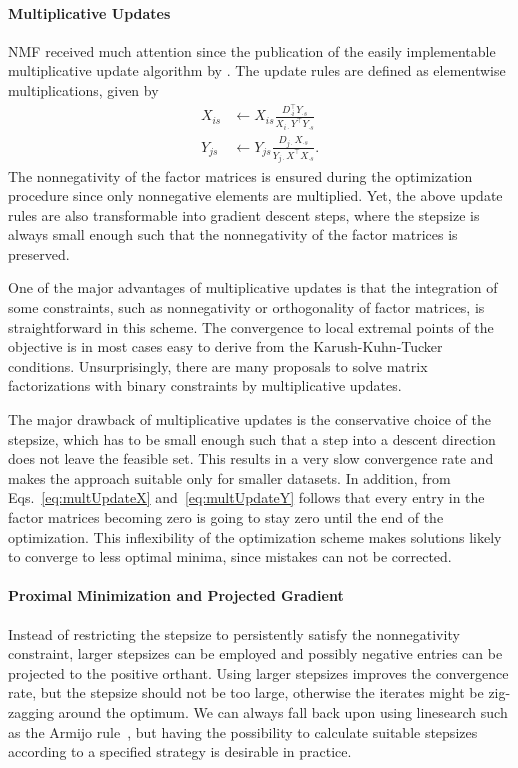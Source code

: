 \paragraph{Multiplicative Updates}
NMF received much attention since the publication of the easily implementable multiplicative update algorithm by \cite{lee2001algorithms}. The update rules are defined as elementwise multiplications, given by
\begin{align}
X_{is} &\leftarrow X_{is} \frac{D_{\cdot i}^\top Y_{\cdot s}}{X_{i\cdot}Y^\top Y_{\cdot s}}\label{eq:multUpdateX}\\
Y_{js} &\leftarrow Y_{js}\frac{D_{j\cdot}X_{\cdot s}}{Y_{j\cdot}X^\top X_{\cdot s}}. \label{eq:multUpdateY} 
\end{align}
The nonnegativity of the factor matrices is ensured during the optimization procedure since only nonnegative elements are multiplied. Yet, the above update rules are also transformable into gradient descent steps, where the stepsize is always small enough such that the nonnegativity of the factor matrices is preserved.

One of the major advantages of multiplicative updates is that the integration of some constraints, such as nonnegativity or orthogonality of factor matrices, is straightforward in this scheme. The  convergence to local extremal points of the objective is in most cases easy to derive from the Karush-Kuhn-Tucker conditions. Unsurprisingly, there are many proposals to solve matrix factorizations with binary constraints by multiplicative updates.  

The major drawback of multiplicative updates is the conservative choice of the stepsize, which has to be small enough such that a step into a descent direction does not leave the feasible set. This results in a very slow convergence rate and makes the approach suitable only for smaller datasets. In addition, from Eqs.~\eqref{eq:multUpdateX} and~\eqref{eq:multUpdateY} follows that every entry in the factor matrices becoming zero is going to stay zero until the end of the optimization. This inflexibility of the optimization scheme makes solutions likely to converge to less optimal minima, since mistakes can not be corrected. 
%
\paragraph{Proximal Minimization and Projected Gradient}
Instead of restricting the stepsize to persistently satisfy the nonnegativity constraint, larger stepsizes can be employed and possibly negative entries can be projected to the positive orthant. Using larger stepsizes improves the convergence rate, but the stepsize should not be too large, otherwise the iterates might be zig-zagging around the optimum. We can always fall back upon using linesearch such as the Armijo rule~\citep{lin2007projected}, but having the possibility to calculate suitable stepsizes according to a specified strategy is desirable in practice.  

